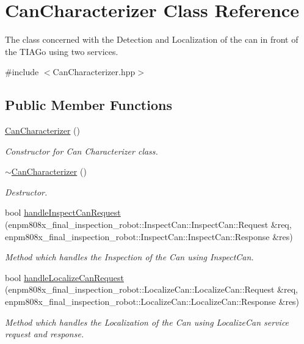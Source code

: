 \hypertarget{classCanCharacterizer}{}\section{Can\+Characterizer Class Reference}
\label{classCanCharacterizer}


The class concerned with the Detection and Localization of the can in front of the T\+I\+A\+Go using two services.  




{\ttfamily \#include $<$Can\+Characterizer.\+hpp$>$}

\subsection*{Public Member Functions}
\begin{DoxyCompactItemize}
\item 
\mbox{\label{classCanCharacterizer_a17d1e06b2b693e6c0f42759928122e20}} 
\hyperlink{classCanCharacterizer_a17d1e06b2b693e6c0f42759928122e20}{Can\+Characterizer} ()
\begin{DoxyCompactList}\small\item\em Constructor for Can Characterizer class. \end{DoxyCompactList}\item 
\mbox{\label{classCanCharacterizer_afb1554dca01b7c19cee2523313dec47f}} 
\hyperlink{classCanCharacterizer_afb1554dca01b7c19cee2523313dec47f}{$\sim$\+Can\+Characterizer} ()
\begin{DoxyCompactList}\small\item\em Destructor. \end{DoxyCompactList}\item 
bool \hyperlink{classCanCharacterizer_a1c4af17fc5c15849ae895c115f2971f4}{handle\+Inspect\+Can\+Request} (enpm808x\+\_\+final\+\_\+inspection\+\_\+robot\+::\+Inspect\+Can\+::\+Inspect\+Can\+::\+Request \&req, enpm808x\+\_\+final\+\_\+inspection\+\_\+robot\+::\+Inspect\+Can\+::\+Inspect\+Can\+::\+Response \&res)
\begin{DoxyCompactList}\small\item\em Method which handles the Inspection of the Can using Inspect\+Can. \end{DoxyCompactList}\item 
bool \hyperlink{classCanCharacterizer_a7a0e5c8217a130f3952a476e5cd59bff}{handle\+Localize\+Can\+Request} (enpm808x\+\_\+final\+\_\+inspection\+\_\+robot\+::\+Localize\+Can\+::\+Localize\+Can\+::\+Request \&req, enpm808x\+\_\+final\+\_\+inspection\+\_\+robot\+::\+Localize\+Can\+::\+Localize\+Can\+::\+Response \&res)
\begin{DoxyCompactList}\small\item\em Method which handles the Localization of the Can using Localize\+Can service request and response. \end{DoxyCompactList}\end{DoxyCompactItemize}


